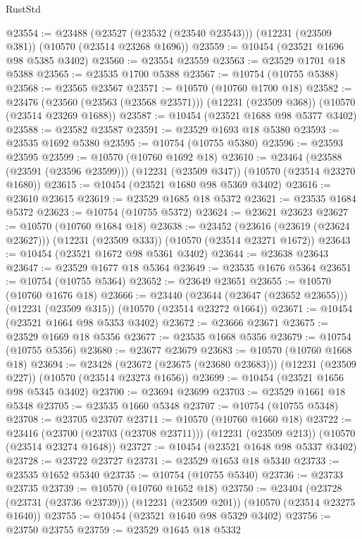 \begin{lexlean}{RustStd}
\begin{coremodule}
@23554 := @23488
    (@23527 (@23532 (@23540 @23543)))
    (@12231 (@23509 @381))
    (@10570 (@23514 @23268 @1696))
@23559 := @10454 (@23521 @1696 @98 @5385 @3402)
@23560 := @23554 @23559
@23563 := @23529 @1701 @18 @5388
@23565 := @23535 @1700 @5388
@23567 := @10754 (@10755 @5388)
@23568 := @23565 @23567
@23571 := @10570 (@10760 @1700 @18)
@23582 := @23476
    (@23560 (@23563 (@23568 @23571)))
    (@12231 (@23509 @368))
    (@10570 (@23514 @23269 @1688))
@23587 := @10454 (@23521 @1688 @98 @5377 @3402)
@23588 := @23582 @23587
@23591 := @23529 @1693 @18 @5380
@23593 := @23535 @1692 @5380
@23595 := @10754 (@10755 @5380)
@23596 := @23593 @23595
@23599 := @10570 (@10760 @1692 @18)
@23610 := @23464
    (@23588 (@23591 (@23596 @23599)))
    (@12231 (@23509 @347))
    (@10570 (@23514 @23270 @1680))
@23615 := @10454 (@23521 @1680 @98 @5369 @3402)
@23616 := @23610 @23615
@23619 := @23529 @1685 @18 @5372
@23621 := @23535 @1684 @5372
@23623 := @10754 (@10755 @5372)
@23624 := @23621 @23623
@23627 := @10570 (@10760 @1684 @18)
@23638 := @23452
    (@23616 (@23619 (@23624 @23627)))
    (@12231 (@23509 @333))
    (@10570 (@23514 @23271 @1672))
@23643 := @10454 (@23521 @1672 @98 @5361 @3402)
@23644 := @23638 @23643
@23647 := @23529 @1677 @18 @5364
@23649 := @23535 @1676 @5364
@23651 := @10754 (@10755 @5364)
@23652 := @23649 @23651
@23655 := @10570 (@10760 @1676 @18)
@23666 := @23440
    (@23644 (@23647 (@23652 @23655)))
    (@12231 (@23509 @315))
    (@10570 (@23514 @23272 @1664))
@23671 := @10454 (@23521 @1664 @98 @5353 @3402)
@23672 := @23666 @23671
@23675 := @23529 @1669 @18 @5356
@23677 := @23535 @1668 @5356
@23679 := @10754 (@10755 @5356)
@23680 := @23677 @23679
@23683 := @10570 (@10760 @1668 @18)
@23694 := @23428
    (@23672 (@23675 (@23680 @23683)))
    (@12231 (@23509 @227))
    (@10570 (@23514 @23273 @1656))
@23699 := @10454 (@23521 @1656 @98 @5345 @3402)
@23700 := @23694 @23699
@23703 := @23529 @1661 @18 @5348
@23705 := @23535 @1660 @5348
@23707 := @10754 (@10755 @5348)
@23708 := @23705 @23707
@23711 := @10570 (@10760 @1660 @18)
@23722 := @23416
    (@23700 (@23703 (@23708 @23711)))
    (@12231 (@23509 @213))
    (@10570 (@23514 @23274 @1648))
@23727 := @10454 (@23521 @1648 @98 @5337 @3402)
@23728 := @23722 @23727
@23731 := @23529 @1653 @18 @5340
@23733 := @23535 @1652 @5340
@23735 := @10754 (@10755 @5340)
@23736 := @23733 @23735
@23739 := @10570 (@10760 @1652 @18)
@23750 := @23404
    (@23728 (@23731 (@23736 @23739)))
    (@12231 (@23509 @201))
    (@10570 (@23514 @23275 @1640))
@23755 := @10454 (@23521 @1640 @98 @5329 @3402)
@23756 := @23750 @23755
@23759 := @23529 @1645 @18 @5332

\end{coremodule}
\end{lexlean}
